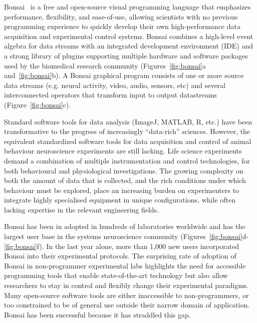
Bonsai~\citep{lopesEtAl15,lopesAndMonteiro21} is a free and open-source visual
programming language that emphasizes performance, flexibility, and ease-of-use,
allowing scientists with no previous programming experience to quickly develop
their own high-performance data acquisition and experimental control systems.
Bonsai combines a high-level event algebra for data streams with an integrated
development environment (IDE) and a strong library of plugins supporting
multiple hardware and software packages used by the biomedical research
community (Figures~\ref{fig:bonsai}a and~\ref{fig:bonsai}b).
%
A Bonsai graphical program consists of one or more source data streams (e.g. neural activity, video, audio, sensors, etc)
and several interconnected operators that transform input to output
datastreams (Figure~\ref{fig:bonsai}c).

Standard software tools for data analysis (ImageJ, MATLAB, R, etc.) have been
transformative to the progress of increasingly “data-rich” sciences. However,
the equivalent standardized software tools for data acquisition and control of
animal behaviour neuroscience experiments are still lacking. Life science experiments demand
a combination of multiple instrumentation and control technologies, for both
behavioural and physiological investigations. The growing complexity on both the
amount of data that is collected, and the rich conditions under which behaviour
must be explored, place an increasing burden on experimenters to integrate
highly specialised equipment in unique configurations, while often lacking
expertise in the relevant engineering fields.

Bonsai has been in adopted in hundreds of laboratories worldwide and has the largest user base in the systems neuroscience community (Figures~\ref{fig:bonsai}d-\ref{fig:bonsai}f).  In the last year alone, more than 1,000 new users incorporated Bonsai into their experimental protocols. The surprising rate of adoption of Bonsai in non-programmer experimental
labs highlights the need for accessible programming tools that enable
state-of-the-art technology but also allow researchers to stay in control and flexibly
change their experimental paradigms.  Many open-source software tools are
either inaccessible to non-programmers, or too constrained to be of general use
outside their narrow domain of application. Bonsai has been successful because
it has straddled this gap.

